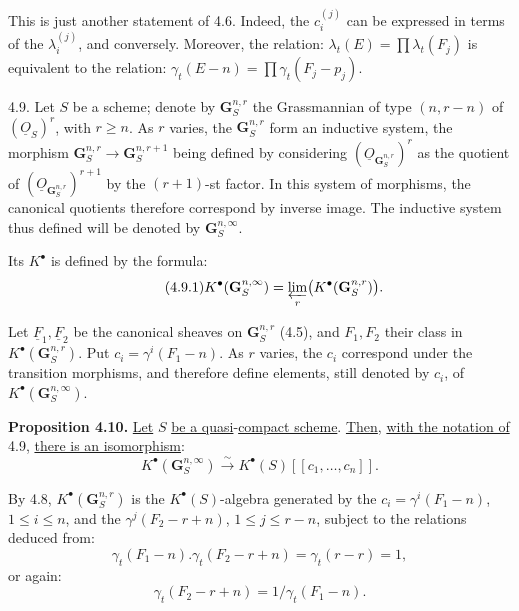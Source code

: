 This is just another statement of 4.6. Indeed, the \(c_i^{(j)}\) can be expressed in terms of the \(\lambda_i^{(j)}\), and conversely. Moreover, the relation: \(\lambda_t(E)=\prod\lambda_t(F_j)\) is equivalent to the relation: \(\gamma_t(E-n)=\prod\gamma_t(F_j-p_j)\).

4.9.
Let \(S\) be a scheme; denote by \(\mathbf G_S^{n,r}\) the Grassmannian of type \((n,r-n)\) of \((\underline{O}_S)^r\), with \(r\ge n\). As \(r\) varies, the \(\mathbf G_S^{n,r}\) form an inductive system, the morphism \(\mathbf G_S^{n,r}\longrightarrow \mathbf G_S^{n,r+1}\) being defined by considering \((\underline{O}_{\mathbf G_S^{n,r}})^r\) as the
%
quotient of \((\underline{O}_{\mathbf G_S^{n,r}})^{r+1}\) by the \((r+1)\)-st factor. In this system of morphisms, the canonical quotients therefore correspond by inverse image. The inductive system thus defined will be denoted by \(\mathbf G_S^{n,\infty}\).

Its \(K^{\bullet}\) is defined by the formula:
\begin{equation}\tag{4.9.1}
  K^{\bullet}(\mathbf G_S^{n,\infty})
  = \varprojlim_r \bigl(K^{\bullet}(\mathbf G_S^{n,r})\bigr) .
\end{equation}

Let \(\underline{F}_1,\underline{F}_2\) be the canonical sheaves on \(\mathbf G_S^{n,r}\) (4.5), and \(F_1,F_2\) their class in \(K^{\bullet}(\mathbf G_S^{n,r})\). Put \(c_i=\gamma^i(F_1-n)\). As \(r\) varies, the \(c_i\) correspond under the transition morphisms, and therefore define elements, still denoted by \(c_i\), of \(K^{\bullet}(\mathbf G_S^{n,\infty})\).

\textbf{Proposition 4.10.} \uline{Let} \(S\) \uline{be a quasi}-\uline{compact scheme}. \uline{Then}, \uline{with the notation of} 4.9, \uline{there is an isomorphism}:
\[
  K^{\bullet}(\mathbf G_S^{n,\infty})\xrightarrow{\sim} K^{\bullet}(S)[[c_1,\ldots,c_n]] .
\]

By 4.8, \(K^{\bullet}(\mathbf G_S^{n,r})\) is the \(K^{\bullet}(S)\)-algebra generated by the \(c_i=\gamma^i(F_1-n)\), \(1\le i\le n\), and the \(\gamma^j(F_2-r+n)\), \(1\le j\le r-n\), subject to the relations deduced from:
\[
  \gamma_t(F_1-n).\gamma_t(F_2-r+n)
  = \gamma_t(r-r)=1,
\]
or again:
\[
  \gamma_t(F_2-r+n)=1/\gamma_t(F_1-n).
\]

